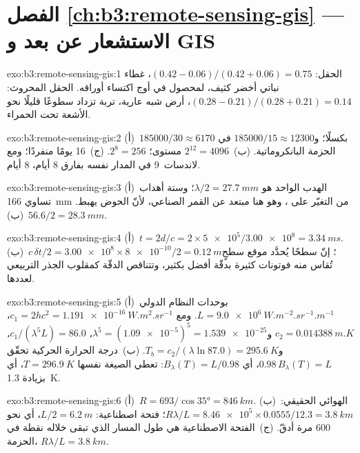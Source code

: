 \section*{الفصل \ref{ch:b3:remote-sensing-gis} --- الاستشعار عن بعد و GIS}

\begin{solution}{exo:b3:remote-sensing-gis:1}
الحقل: $(0.42 - 0.06)/(0.42 + 0.06) = 0.75$، غطاء نباتي أخضر كثيف، لمحصول
في أوج اكتساء أوراقه. الحقل المحروث: $(0.28 - 0.21)/(0.28 + 0.21) = 0.14$، أرض شبه عارية،
تربة تزداد سطوعًا قليلًا نحو الأشعة تحت الحمراء.
\end{solution}

\begin{solution}{exo:b3:remote-sensing-gis:2}
(أ)~$185000/30 \approx 6170$ بكسلًا؛ و$185000/15 \approx 12300$
في الحزمة البانكروماتية. (ب)~$2^{12} = 4096$ مستوى؛ $2^8 = 256$. (ج)~16 يومًا
منفردًا؛ ومع لاندسات~9 في المدار نفسه بفارق 8 أيام، 8 أيام.
\end{solution}

\begin{solution}{exo:b3:remote-sensing-gis:3}
(أ)~الهدب الواحد هو $\lambda/2 = \qty{27.7}{mm}$؛ وستة أهداب تساوي
\qty{166}{mm} من التغيّر على ، وهو هنا مبتعد عن القمر الصناعي، لأنّ
الحوض يهبط. (ب)~$56.6/2 = \qty{28.3}{mm}$.
\end{solution}

\begin{solution}{exo:b3:remote-sensing-gis:4}
(أ)~$t = 2d/c = 2\times\num{5e5}/\num{3.00e8} = \qty{3.34}{ms}$.
(ب)~$c\,\delta t/2 = \num{3.00e8}\times\num{8e-10}/2 = \qty{0.12}{m}$؛ إنّ سطحًا
يُحدَّد موقع سطحٍ تُقاس منه فوتونات كثيرة بدقّة أفضل بكثير، وتتناقص الدقّة
كمقلوب الجذر التربيعي لعددها.
\end{solution}

\begin{solution}{exo:b3:remote-sensing-gis:5}
(أ)~بوحدات النظام الدولي $L = \qty{9.0e6}{W.m^{-2}.sr^{-1}.m^{-1}}$. ومع $c_1 =
2hc^2 = \qty{1.191e-16}{W.m^2.sr^{-1}}$، $c_2 = \qty{0.014388}{m.K}$
و$\lambda^5 = (\num{1.09e-5})^5 = \num{1.539e-25}$، $c_1/(\lambda^5L) = 86.0$،
و$T_b = c_2/(\lambda\ln 87.0) = \qty{295.6}{K}$. (ب)~درجة الحرارة الحركية
تحقّق $0.98\,B_\lambda(T) = L$، أي $B_\lambda(T) = L/0.98$: تعطي الصيغة نفسها
$T = \qty{296.9}{K}$، أي بزيادة \qty{1.3}{K}.
\end{solution}

\begin{solution}{exo:b3:remote-sensing-gis:6}
(أ)~$R = 693/\cos\ang{35} = \qty{846}{km}$. (ب)~الهوائي الحقيقي: $R\lambda/L =
\num{8.46e5}\times0.0555/12.3 = \qty{3.8}{km}$؛ فتحة اصطناعية: $L/2 =
\qty{6.2}{m}$، أي نحو 600 مرة أدقّ. (ج)~الفتحة الاصطناعية هي طول المسار
الذي تبقى خلاله نقطة في الحزمة، $R\lambda/L =
\qty{3.8}{km}$.
\end{solution}

